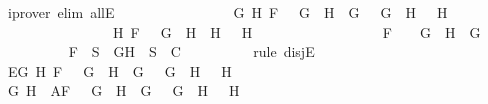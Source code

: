 \begin{isabellebody}
\ {\isacharparenleft}iprover\ elim{\isacharcolon}\ allE{\isacharparenright}\isanewline
\ \ \ \ \ \ \isamarkupfalse%
\isanewline
\ \ \ \ \ \ \ \ \isamarkupfalse%
\ {\isachardoublequoteopen}{\isacharparenleft}{\isasymexists}G{}\ H{}{\isachardot}\ F\ {\isacharequal}\ \isactrlbold {\isasymnot}\ {\isacharparenleft}G{}\ \isactrlbold {\isasymor}\ H{}{\isacharparenright}\ {\isasymand}\ G\ {\isacharequal}\ \isactrlbold {\isasymnot}\ G{}\ {\isasymand}\ H\ {\isacharequal}\ \isactrlbold {\isasymnot}\ H{}{\isacharparenright}\ {\isasymor}\ \isanewline
\ \ \ \ \ \ \ \ \ \ \ \ \ \ \ \ {\isacharparenleft}{\isasymexists}H{}{\isachardot}\ F\ {\isacharequal}\ \isactrlbold {\isasymnot}\ {\isacharparenleft}G\ \isactrlbold {\isasymrightarrow}\ H{}{\isacharparenright}\ {\isasymand}\ H\ {\isacharequal}\ \isactrlbold {\isasymnot}\ H{}{\isacharparenright}\ {\isasymor}\ \isanewline
\ \ \ \ \ \ \ \ \ \ \ \ \ \ \ \ F\ {\isacharequal}\ \isactrlbold {\isasymnot}\ {\isacharparenleft}\isactrlbold {\isasymnot}\ G{\isacharparenright}\ {\isasymand}\ H\ {\isacharequal}\ G{\isachardoublequoteclose}\isanewline
\ \ \ \ \ \ \ \ \isamarkupfalse%
\ {\isachardoublequoteopen}F\ {\isasymin}\ S\ {\isasymlongrightarrow}\ {\isacharbraceleft}G{\isacharcomma}H{\isacharbraceright}\ {\isasymunion}\ S\ {\isasymin}\ C{\isachardoublequoteclose}\isanewline
\ \ \ \ \ \ \ \ \isamarkupfalse%
\ {\isacharparenleft}rule\ disjE{\isacharparenright}\isanewline
\ \ \ \ \ \ \ \ \ \ \isamarkupfalse%
\ E{}{\isacharcolon}{\isachardoublequoteopen}{\isasymexists}G{}\ H{}{\isachardot}\ F\ {\isacharequal}\ \isactrlbold {\isasymnot}\ {\isacharparenleft}G{}\ \isactrlbold {\isasymor}\ H{}{\isacharparenright}\ {\isasymand}\ G\ {\isacharequal}\ \isactrlbold {\isasymnot}\ G{}\ {\isasymand}\ H\ {\isacharequal}\ \isactrlbold {\isasymnot}\ H{}{\isachardoublequoteclose}\isanewline
\ \ \ \ \ \ \ \ \ \ \isamarkupfalse%
\ G{}\ H{}\ \ A{}{\isacharcolon}{\isachardoublequoteopen}F\ {\isacharequal}\ \isactrlbold {\isasymnot}\ {\isacharparenleft}G{}\ \isactrlbold {\isasymor}\ H{}{\isacharparenright}\ {\isasymand}\ G\ {\isacharequal}\ \isactrlbold {\isasymnot}\ G{}\ {\isasymand}\ H\ {\isacharequal}\ \isactrlbold {\isasymnot}\ H{}{\isachardoublequoteclose}\isanewline

\end{isabellebody}
